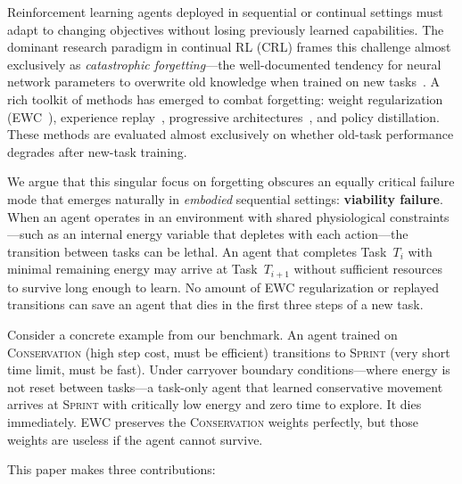\documentclass{article}
\begin{document}
Reinforcement learning agents deployed in sequential or continual settings
must adapt to changing objectives without losing previously learned capabilities.
The dominant research paradigm in continual RL (CRL) frames this challenge
almost exclusively as \emph{catastrophic forgetting}---the well-documented
tendency for neural network parameters to overwrite old knowledge when trained
on new tasks~\citep{Parisi2019,kirkpatrick2017,continualworld2021}. A rich
toolkit of methods has emerged to combat forgetting: weight regularization
(EWC~\citep{kirkpatrick2017}), experience replay~\citep{rolnick2019}, progressive
architectures~\citep{rusu2016}, and policy distillation. These methods are
evaluated almost exclusively on whether old-task performance degrades after
new-task training.

We argue that this singular focus on forgetting obscures an equally critical
failure mode that emerges naturally in \emph{embodied} sequential settings:
\textbf{viability failure}. When an agent operates in an environment with
shared physiological constraints---such as an internal energy variable that
depletes with each action---the transition between tasks can be lethal. An agent
that completes Task~$T_i$ with minimal remaining energy may arrive at
Task~$T_{i+1}$ without sufficient resources to survive long enough to learn.
No amount of EWC regularization or replayed transitions can save an agent
that dies in the first three steps of a new task.

Consider a concrete example from our benchmark. An agent trained on
\textsc{Conservation} (high step cost, must be efficient) transitions to
\textsc{Sprint} (very short time limit, must be fast). Under carryover
boundary conditions---where energy is not reset between tasks---a task-only
agent that learned conservative movement arrives at \textsc{Sprint} with
critically low energy and zero time to explore. It dies immediately. EWC
preserves the \textsc{Conservation} weights perfectly, but those weights
are useless if the agent cannot survive.

This paper makes three contributions:
\end{document}
